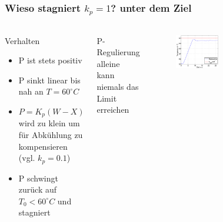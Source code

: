 \begin{frame}
    \frametitle{Wieso stagniert $k_p = 1$? unter dem Ziel}
    \framesubtitle{}
    \begin{columns}[c]
            \begin{block}{Verhalten}
                \begin{itemize}
                    \item P ist stets positiv
                    \item P sinkt linear bis nah an $T=60^{\circ}C$
                    \item $P=K_p(W-X)$ wird zu klein um für Abkühlung zu
                    kompensieren (vgl. $k_p=0.1$)
                    \item P schwingt zurück auf $T_0 < 60^{\circ}C$ und
                    stagniert
                \end{itemize}
            \end{block}
            \begin{alertblock}{}
                P-Regulierung alleine kann niemals das Limit erreichen
            \end{alertblock}
            \begin{figure}[H]
            \begin{center}
                    \includegraphics[scale=0.3]{./img/plots/Auf_2_b_1.eps}
            \end{center}
            \end{figure}
            \begin{figure}[H]

\end{figure}
\end{columns}
\end{frame}
